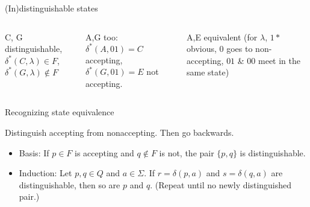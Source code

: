 \documentclass[handout]{beamer}
\begin{document}
\begin{frame}{(In)distinguishable states}
\begin{example}
\begin{columns}

            \small

            C, G distinguishable, $\delta^*(C,\lambda)\in{ F}$, $\delta^*(G,\lambda)\notin{ F}$

            \smallskip
                
            A,G too: $\delta^*(A,01)=C$ accepting, $\delta^*(G,01)=E$ not accepting.
            
            \smallskip

            A,E equivalent (for $\lambda$, $1*$ obvious, $0$ goes to non-accepting, $01$ \& $00$ meet in the same state)

        \end{columns}

    \end{example}
            
\end{frame}


\begin{frame}{Recognizing state equivalence}

    Distinguish accepting from nonaccepting. Then go backwards.
    
    \begin{algorithm}    
        \begin{itemize}
            \item \alert{Basis:} If $p\in { F}$ is accepting and $q\notin{ F}$ is not, the pair  $ \{p,q\}$ is distinguishable.
            \item \alert{Induction:} Let $p,q\in Q$ and $a\in \Sigma$. If $r=\delta(p,a)$ and $s=\delta(q,a)$ are distinguishable, then so are $p$ and $q$. (Repeat until no newly distinguished pair.)
        \end{itemize}
    \end{algorithm}

\end{frame}
\end{document}
